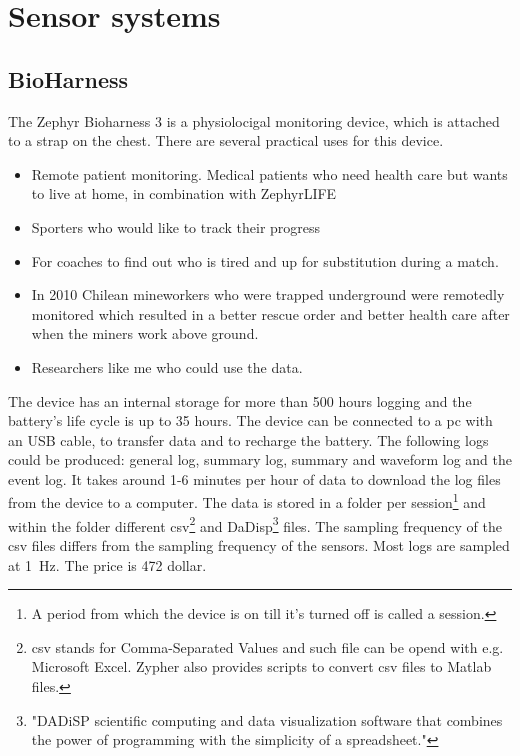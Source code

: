 \section{Sensor systems}
	\subsection{BioHarness}
			The Zephyr Bioharness 3\cite{bioharness} is a physiolocigal monitoring device, which is attached to a strap on the chest. There are several practical uses for this device.
			\begin{itemize}
				\item Remote patient monitoring. Medical patients who need health care but wants to live at home, in combination with ZephyrLIFE \texttrademark \cite{bhpatients}
				\item Sporters who would like to track their progress 
				\item For coaches to find out who is tired and up for substitution during a match. \cite{bhsport}
				\item In 2010 Chilean mineworkers who were trapped underground were remotedly monitored which resulted in a better rescue order and better health care after when the miners work above ground. \cite{chile}
				\item Researchers like me who could use the data.
			\end{itemize}

			The device has an internal storage for more than 500 hours logging and the battery's life cycle is up to 35 hours. The device can be connected to a pc with an USB cable, to transfer data and to recharge the battery. The following logs could be produced: general log, summary log, summary and waveform log and the event log. 
			It takes around 1-6 minutes per hour of data to download the log files from the device to a computer. \cite{bhdatasheet} The data is stored in a folder per session\footnote{A period from which the device is on till it's turned off is called a session.} and within the folder different csv\footnote{csv stands for Comma-Separated Values and such file can be opend with e.g. Microsoft Excel. Zypher also provides scripts to convert csv files to Matlab files.} and DaDisp\footnote{"DADiSP scientific computing and data visualization software that combines the power of programming with the simplicity of a spreadsheet."\cite{dadisp}} files. The sampling frequency of the csv files differs from the sampling frequency of the sensors. Most logs are sampled at \SI{1}{\hertz}.
			The price is 472 dollar.
		
